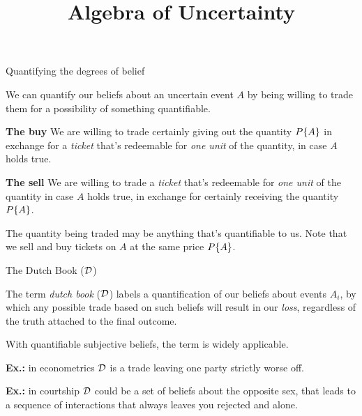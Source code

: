 

\title[Algebra of Uncertainty]{Algebra of Uncertainty}






\begin{frame}{Quantifying the degrees of belief}
\begin{minipage}[]{\linewidth}
We can quantify our beliefs about an uncertain event $A$ by being willing to trade them for a possibility of something quantifiable.
\end{minipage}
\vfill
\begin{minipage}[]{\linewidth}
\begin{minipage}[]{0.45\linewidth}
{\textbf{The buy}}
We are willing to trade certainly giving out the quantity $P\{A\}$ in exchange for a \emph{ticket} that's redeemable for \emph{one unit} of the quantity, in case $A$ holds true.

\end{minipage}
\hfill
\begin{minipage}[]{0.45\linewidth}
{\textbf{The sell}}
We are willing to trade a \emph{ticket} that's redeemable for \emph{one unit} of the quantity in case $A$ holds true, in exchange for certainly receiving the quantity $P\{A\}$.
\end{minipage}
\end{minipage}
\vfill
\begin{minipage}[]{\linewidth}
The quantity being traded may be anything that's quantifiable to us. Note that we sell and buy tickets on $A$ at the same price $P\{A\}$.
\end{minipage}
\end{frame}

\begin{frame}{The Dutch Book ($\mathcal{D}$)}
\begin{minipage}[]{\linewidth}
The term \emph{dutch book} ($\mathcal{D}$) labels a quantification of our beliefs about events $A_i$, by which any possible trade based on such beliefs will result in our \emph{loss}, regardless of the truth attached to the final outcome.
\end{minipage}
\vfill
\begin{minipage}[]{\linewidth}
\begin{minipage}[]{0.45\linewidth}
With quantifiable subjective beliefs, the term is widely applicable.\bigskip

{\textbf{Ex.:}} in econometrics $\mathcal{D}$ is a trade leaving one party strictly worse off.
\end{minipage}
\hfill
\begin{minipage}[]{0.45\linewidth}
{\textbf{Ex.:}} in courtship $\mathcal{D}$ could be a set of beliefs about the opposite sex, that leads to a sequence of interactions that always leaves you rejected and alone.%
\end{minipage}
\end{minipage}
\end{frame}

